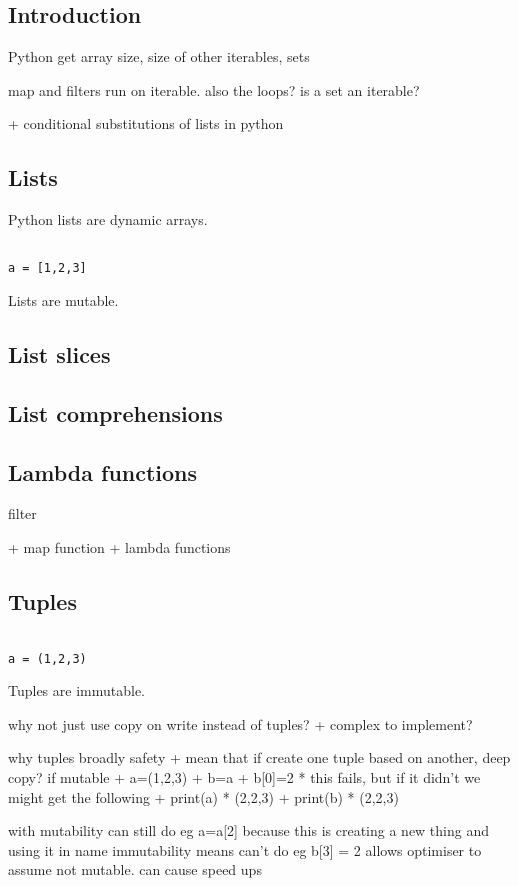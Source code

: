 
\subsection{Introduction}

Python get array size,  size of other iterables, sets

map and filters run on iterable. also the loops?
is a set an iterable?

+ conditional substitutions of lists in python

\subsection{Lists}

Python lists are dynamic arrays.

\begin{verbatim}

a = [1,2,3]

\end{verbatim}

Lists are mutable.

\subsection{List slices}

\subsection{List comprehensions}

\subsection{Lambda functions}
filter

+ map function
+ lambda functions

\subsection{Tuples}

\begin{verbatim}

a = (1,2,3)

\end{verbatim}

Tuples are immutable.

why not just use copy on write instead of tuples?
+ complex to implement?

why tuples
broadly safety
+ mean that if create one tuple based on another, deep copy?
if mutable
+ a=(1,2,3)
+ b=a
+ b[0]=2
  * this fails, but if it didn't we might get the following
+ print(a)
  * (2,2,3)
+ print(b)
  * (2,2,3)

with mutability can still do eg a=a[2] because this is creating a new thing and using it in name
immutability means can't do eg b[3] = 2
allows optimiser to assume not mutable. can cause speed ups

